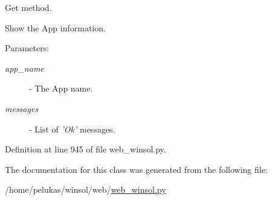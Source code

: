Get method. 

Show the App information.

\begin{Desc}
\item[Parameters:]
\begin{description}
\item[{\em app\_\-name}]- The App name. \item[{\em messages}]- List of {\em 'Ok'\/} messages. \end{description}
\end{Desc}


Definition at line 945 of file web\_\-winsol.py.

The documentation for this class was generated from the following file:\begin{CompactItemize}
\item 
/home/pelukas/winsol/web/\hyperlink{web__winsol_8py}{web\_\-winsol.py}\end{CompactItemize}
